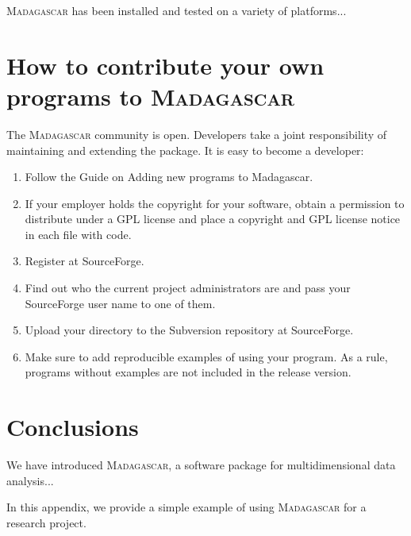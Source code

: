 \textsc{Madagascar} has been installed and tested on a variety of platforms...

\section{How to contribute your own programs to \textsc{Madagascar}}

The \textsc{Madagascar} community is open. Developers take a joint
responsibility of maintaining and extending the package. It is easy to
become a developer:
\begin{enumerate}
\item  Follow the Guide on Adding new programs to Madagascar.
\item  If your employer holds the copyright for your software, 
obtain a permission to distribute under a GPL license and place a
copyright and GPL license notice in each file with code.
\item Register at SourceForge.
\item Find out who the current project administrators are and pass your SourceForge
user name to one of them.
\item Upload your directory to the Subversion repository at SourceForge.
\item Make sure to add reproducible examples of using your program. 
As a rule, programs without examples are not included in the release
version.
\end{enumerate}	

\section{Conclusions}

We have introduced \textsc{Madagascar}, a software package for
multidimensional data analysis...





In this appendix, we provide a simple example of using
\textsc{Madagascar} for a research project.


